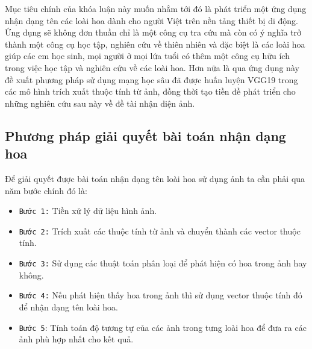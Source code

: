 \documentclass[12pt]{report}
\begin{document}
		Mục tiêu chính của khóa luận này muốn nhắm tới đó là phát triển một ứng dụng nhận dạng tên các loài hoa dành cho người Việt trên nền tảng thiết bị di động. Ứng dụng sẽ không đơn thuần chỉ là một công cụ tra cứu mà còn có ý nghĩa trở thành một công cụ học tập, nghiên cứu về thiên nhiên và đặc biệt là các loài hoa giúp các em học sinh, mọi người ở mọi lứa tuổi có thêm một công cụ hữu ích trong việc học tập và nghiên cứu về các loài hoa. Hơn nữa là qua ứng dụng này đề xuất phương pháp sử dụng mạng học sâu đã được huấn luyện VGG19 \cite{cia_vgg19} trong các mô hình trích xuất thuộc tính từ ảnh, đồng thời tạo tiền đề phát triển cho những nghiên cứu sau này về đề tài nhận diện ảnh.
																																																																						
		
																																																																						
		\subsection{Phương pháp giải quyết bài toán nhận dạng hoa}
																																																																				
		Để giải quyết được bài toán nhận dạng tên loài hoa sử dụng ảnh ta cần phải qua năm bước chính đó là:
																																																																				
		\begin{itemize}
			\item \texttt{Bước 1:} Tiền xử lý dữ liệu hình ảnh.
			\item \texttt{Bước 2:} Trích xuất các thuộc tính từ ảnh và chuyển thành các vector thuộc tính.
			\item \texttt{Bước 3:} Sử dụng các thuật toán phân loại để phát hiện có hoa trong ảnh hay không.
			\item \texttt{Bước 4:}	Nếu phát hiện thấy hoa trong ảnh thì sử dụng vector thuộc tính đó để nhận dạng tên loài hoa.
			\item \texttt{Bước 5}: Tính toán độ tương tự của các ảnh trong tưng loài hoa để đưa ra các ảnh phù hợp nhất cho kết quả.
		\end{itemize}
																																																																		
																																																																		
\end{document}
